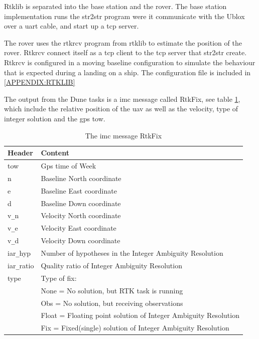 Rtklib is separated into the base station and the rover. The base station implementation runs the  str2str program were it communicate with the Ublox over a uart cable, and start up a tcp server.

The rover uses the rtkrcv program from rtklib to estimate the position of the rover. Rtkrcv connect itself as a tcp client to the tcp server that str2str create. Rtkrcv is configured in a moving baseline configuration to simulate the behaviour that is expected during a landing on a ship. The configuration file is included in \ref{APPENDIX:RTKLIB}

The output from the Dune tasks is a \gls{imc} message called RtkFix, see table \ref{Tb:RtkFix}, which include the relative position of the \gls{uav} as well as the velocity, type of integer solution and the \gls{gps} \gls{tow}.
\begin{table}[!h]
\begin{center}
    \begin{tabular}{ | l | l |}
    \hline
    \textbf{Header} & \textbf{Content} \\ \hline
     tow & Gps time of Week  \\ \hline
     n & Baseline North coordinate \\ \hline
     e & Baseline East coordinate \\ \hline
     d & Baseline Down coordinate \\ \hline
     v\verb=_=n & Velocity North coordinate \\ \hline
     v\verb=_=e & Velocity East coordinate \\ \hline
     v\verb=_=d & Velocity Down coordinate \\ \hline
     iar\verb=_=hyp & Number of hypotheses in the Integer Ambiguity Resolution \\ \hline
     iar\verb=_=ratio & Quality ratio of Integer Ambiguity Resolution \\ \hline
     type & Type of fix: \\& None = No solution, but RTK task is running
     \\& Obs = No solution, but receiving observations
     \\& Float = Floating point solution of Integer Ambiguity Resolution
     \\& Fix = Fixed(single) solution of Integer Ambiguity Resolution \\ \hline
    \end{tabular}
\end{center}
\caption{The \gls{imc} message RtkFix }
\label{Tb:RtkFix}
\end{table}


